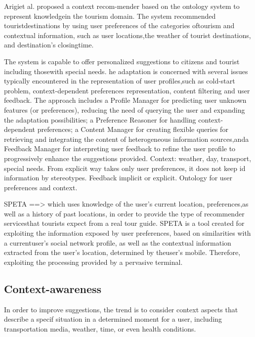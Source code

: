 Arigiet al. \cite{arigi2018context} proposed a context recom-mender based on the ontology system to represent knowledgein the tourism domain. The system recommended touristdestinations by using user preferences of the categories oftourism and contextual information, such as user locations,the weather of tourist destinations, and destination’s closingtime.


\cite{alonso2012ontology}  The  system  is  capable  to offer personalized  suggestions to  citizens  and tourist including thosewith  special  needs. he  adaptation  is  concerned  with  several  issues typically  encountered  in  the  representation  of  user  profiles,such   as   cold-start   problem,   context-dependent   preferences representation,   content   filtering   and   user   feedback.   The approach   includes   a   Profile   Manager   for   predicting   user unknown   features   (or   preferences),   reducing   the   need   of querying the  user and expanding the  adaptation possibilities; a Preference Reasoner for handling context-dependent preferences; a Content Manager for creating flexible queries for retrieving and   integrating   the   content   of   heterogeneous information  sources,anda  Feedback  Manager  for interpreting user   feedback   to   refine   the   user   profile   to   progressively enhance the suggestions provided. Context: weather, day, transport, special needs. From explicit way takes only user preferences, it does not keep id information by stereotypes. Feedback implicit or explicit.
Ontology for user preferences and context.


SPETA ==> which uses knowledge of the user’s current location, preferences,as well as a history of past locations, in order to provide the type of recommender servicesthat tourists expect from a real tour guide. SPETA is a tool created for exploiting the information exposed by user preferences, based on similarities with a currentuser’s social network profile, as well as the contextual information extracted from the user’s location, determined by theuser’s mobile. Therefore, exploiting the processing provided by a pervasive terminal.




\subsection{Context-awareness}
In order to improve suggestions, the trend is to consider context aspects that describe a specif situation in a determined moment for a user, including transportation media, weather, time, or even health conditions. 

